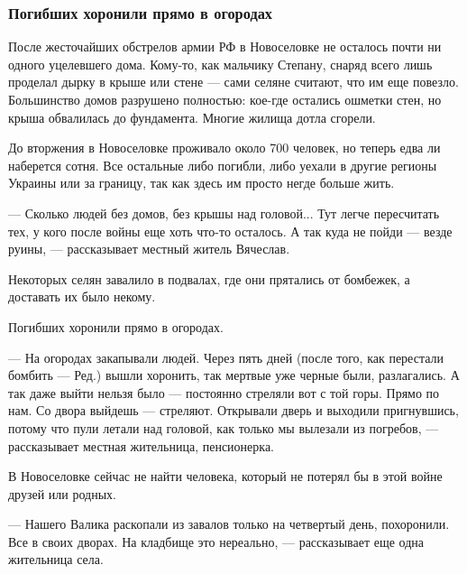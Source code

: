  
 
 
 
 

\subsubsection{Погибших хоронили прямо в огородах}

После жесточайших обстрелов армии РФ в Новоселовке не осталось почти ни одного
уцелевшего дома. Кому-то, как мальчику Степану, снаряд всего лишь проделал
дырку в крыше или стене — сами селяне считают, что им еще повезло. Большинство
домов разрушено полностью: кое-где остались ошметки стен, но крыша обвалилась
до фундамента. Многие жилища дотла сгорели. 

До вторжения в Новоселовке проживало около 700 человек, но теперь едва ли
наберется сотня. Все остальные либо погибли, либо уехали в другие регионы
Украины или за границу, так как здесь им просто негде больше жить.

— Сколько людей без домов, без крышы над головой... Тут легче пересчитать тех, у
кого после войны еще хоть что-то осталось. А так куда не пойди — везде руины, —
рассказывает местный житель Вячеслав.


Некоторых селян завалило в подвалах, где они прятались от бомбежек, а доставать
их было некому.

Погибших хоронили прямо в огородах.

— На огородах закапывали людей. Через пять дней (после того, как перестали
бомбить — Ред.) вышли хоронить, так мертвые уже черные были, разлагались. А так
даже выйти нельзя было — постоянно стреляли вот с той горы. Прямо по нам. Со
двора выйдешь — стреляют. Открывали дверь и выходили пригнувшись, потому что
пули летали над головой, как только мы вылезали из погребов, — рассказывает
местная жительница, пенсионерка. 

В Новоселовке сейчас не найти человека, который не потерял бы в этой войне
друзей или родных. 

— Нашего Валика раскопали из завалов только на четвертый день, похоронили. Все
в своих дворах. На кладбище это нереально, — рассказывает еще одна жительница
села.

